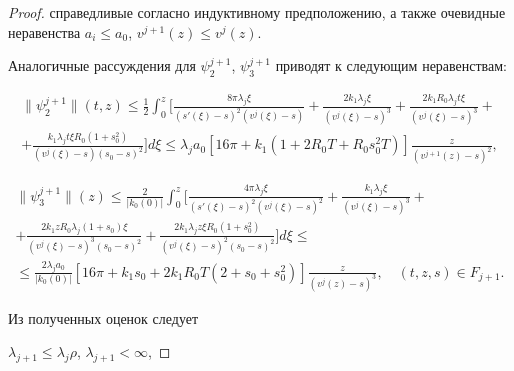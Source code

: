 \begin{proof}
справедливые согласно индуктивному предположению, а также очевидные неравенства ${a_i} \leqslant {a_0}$, ${v^{j + 1}}(z) \leqslant {v^j}(z)$.

 Аналогичные рассуждения для $\psi _2^{j + 1}$, $\psi _3^{j + 1}$ приводят к следующим неравенствам:

\begin{multline*}

\| \psi _2^{j + 1} \|(t,z) \leqslant \frac 12 \int_0^z 

\biggl[ \frac{{8\pi {\lambda _j}\xi }}{{{{(s'(\xi ) - s )}^2}(v^j(\xi ) - s)}} + 

\frac{{2{k_1}{\lambda _j}\xi }}{{{{({v^j}(\xi ) - s)}^3}}} + \frac{{2{k_1}{R_0}  {\lambda _j}t\xi }}{{{{(v^j(\xi ) - s)}^3}}} + 

\\

 + \frac{{{k_1}{\lambda _j}t\xi {R_0}(1 + s_0^2)}}{{( v^j(\xi ) - s){{({s_0} - s)}^2}}}\biggr]d\xi  \leqslant {\lambda _j} a_0 \left[ {16\pi  + {k_1}\left( {1 + 2{R_0}T + {R_0}s_0^2T}

 \right)} \right]\frac{z}{{{{({v^{j + 1}}(z) - s)}^2}}},

\end{multline*}

\begin{multline*}

\| \psi _3^{j + 1} \|(z) \leqslant \frac{2}{{| {{k_0}(0)} |}}\int_0^z \biggl[ \frac{{4\pi {\lambda _j}\xi }} {{{{( s'(\xi ) - s)}^2}{{(v^j(\xi ) - s)}^2}}} +  \frac{{{k_1}{\lambda _j}\xi }}{{{{({v^j}(\xi ) - s)}^3}}} + \\ + \frac{{2{k_1}z{R_0}{\lambda _j}(1 + {s_0})\xi }}{{{{(v^j(\xi ) - s)}^3}{{({s_0} - s)}^2}}}  + \frac{{2{k_1}{\lambda _j}z\xi

  {R_0}(1 + s_0^2)}}{{{{(v^j(\xi ) - s)}^2}{{({s_0} - s)}^2}}}\biggr]d\xi  \leqslant \\

\leqslant\frac{{2{\lambda _j}{a_0}}}{{\left| {{k_0}(0)} \right|}}\left[ {16\pi  + {k_1}{s_0} + 2{k_1}{R_0}T\left( {2 + {s_0} + s_0^2} \right)}

   \right]\frac{z}{{{{({v^j}(z) - s)}^3}}},\quad (t, z, s)  \in {F_{j + 1}}.

\end{multline*} 

Из полученных оценок следует

${\lambda _{j + 1}} \leqslant {\lambda _j}\rho$,  ${\lambda _{j + 1}} < \infty$,  


\end{proof}
